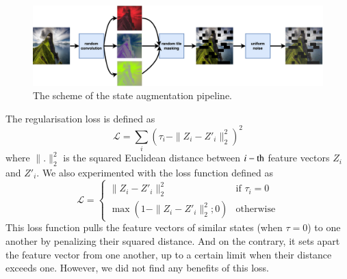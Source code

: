 \documentclass[a4paper,11pt]{elsarticle}
\begin{document}
\begin{figure}
\centering
\includegraphics[width=14cm]{fig/diagrams/cnd-augmentations.png}
\caption{The scheme of the state augmentation pipeline.}
\label{fig:stdv_augmentations}
\end{figure}

The regularisation loss is defined as
\begin{equation}
\label{eq:sndv1}
\mathcal{L} = \sum_{i}(\tau_i - \|Z_i - Z'_i\|^2_2)^2
\end{equation}
where $\|.\|^2_2$ is the squared Euclidean distance between $i-{\rm th}$ feature vectors $Z_i$ and $Z'_i$. 
We also experimented with the loss function defined as
\begin{equation}
\label{eq:sndv2}
\mathcal{L} = 
  \begin{cases}
    \|Z_i - Z'_i\|^2_2 & \text{if $\tau_i = 0$} \\
    \max(1 - \|Z_i - Z'_i\|^2_2; 0) & \text{otherwise}
  \end{cases}
\end{equation}
This loss function pulls the feature vectors of similar states (when $\tau = 0$) to one another by penalizing their squared distance. And on the contrary, it sets apart the feature vector from one another, up to a certain limit when their distance exceeds one.
However, we did not find any benefits of this loss.
\end{document}
